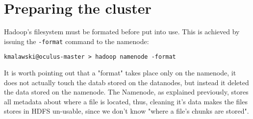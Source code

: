 
\chapter{Preparing the cluster}

Hadoop's filesystem must be formated before put into use. This is achieved by issuing the \verb|-format| command to the namenode:

\begin{verbatim}
kmalawski@oculus-master > hadoop namenode -format
\end{verbatim}

It is worth pointing out that a "format" takes place only on the namenode, it does not actually touch the datab stored on the datanodes,
but instead it deleted the data stored on the namenode. The Namenode, as explained previously, stores all metadata about where a file is located,
thus, cleaning it's data makes the files stores in HDFS un-usable, since we don't know "where a file's chunks are stored".